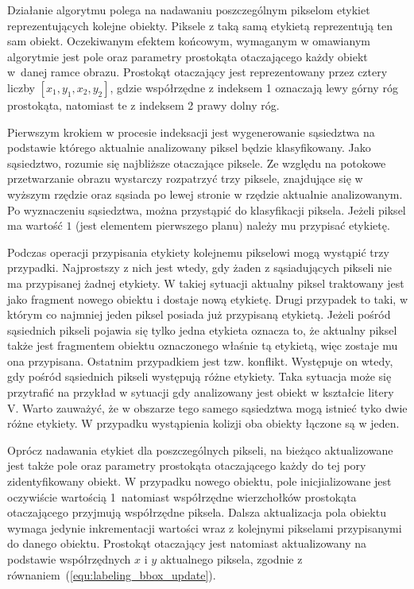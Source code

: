 Działanie algorytmu polega na nadawaniu poszczególnym pikselom etykiet reprezentujących kolejne obiekty. 
Piksele z taką samą etykietą reprezentują ten sam obiekt. 
Oczekiwanym efektem końcowym, wymaganym w omawianym algorytmie jest pole oraz parametry prostokąta otaczającego każdy obiekt w~danej ramce obrazu.
Prostokąt otaczający jest reprezentowany przez cztery liczby $[x_1,y_1,x_2,y_2]$, gdzie współrzędne z indeksem 1 oznaczają lewy górny róg prostokąta, natomiast te z indeksem 2 prawy dolny róg. 

Pierwszym krokiem w procesie indeksacji jest wygenerowanie sąsiedztwa na podstawie którego aktualnie analizowany piksel będzie klasyfikowany. 
Jako sąsiedztwo, rozumie się najbliższe otaczające piksele. 
Ze względu na potokowe przetwarzanie obrazu wystarczy rozpatrzyć trzy piksele, znajdujące się w wyższym rzędzie oraz sąsiada po lewej stronie w rzędzie aktualnie analizowanym. 
Po wyznaczeniu sąsiedztwa, można przystąpić do klasyfikacji piksela. 
Jeżeli piksel ma wartość $1$ (jest elementem pierwszego planu) należy mu przypisać etykietę.  

Podczas operacji przypisania etykiety kolejnemu pikselowi mogą wystąpić trzy przypadki. 
Najprostszy z nich jest wtedy, gdy żaden z sąsiadujących pikseli nie ma przypisanej żadnej etykiety. 
W takiej sytuacji aktualny piksel traktowany jest jako fragment nowego obiektu i dostaje nową etykietę. 
Drugi przypadek to taki, w którym co najmniej jeden piksel posiada już przypisaną etykietą. 
Jeżeli pośród sąsiednich pikseli pojawia się tylko jedna etykieta oznacza to, że aktualny piksel także jest fragmentem obiektu oznaczonego właśnie tą etykietą, więc zostaje mu ona przypisana.
Ostatnim przypadkiem jest tzw. konflikt. 
Występuje on wtedy, gdy pośród sąsiednich pikseli występują różne etykiety. 
Taka sytuacja może się przytrafić na przykład w sytuacji gdy analizowany jest obiekt w kształcie litery V. 
Warto zauważyć, że w obszarze tego samego sąsiedztwa mogą istnieć tyko dwie różne etykiety. 
W przypadku wystąpienia kolizji oba obiekty łączone są w jeden.

Oprócz nadawania etykiet dla poszczególnych pikseli, na bieżąco aktualizowane jest także pole oraz parametry prostokąta otaczającego każdy do tej pory zidentyfikowany obiekt. 
W przypadku nowego obiektu, pole inicjializowane jest oczywiście wartością 1~natomiast współrzędne wierzchołków prostokąta otaczającego przyjmują współrzędne piksela. 
Dalsza aktualizacja pola obiektu wymaga jedynie inkrementacji wartości wraz z kolejnymi pikselami przypisanymi do danego obiektu. Prostokąt otaczający jest natomiast aktualizowany na podstawie współrzędnych $x$ i $y$ aktualnego piksela, zgodnie z równaniem~(\ref{equ:labeling_bbox_update}).

